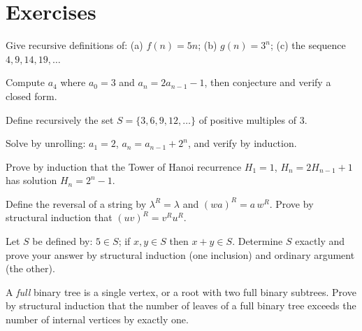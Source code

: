 \section*{Exercises}

\begin{exercise}{\easy}
Give recursive definitions of: (a) $f(n) = 5n$; (b) $g(n) = 3^{n}$;
(c) the sequence $4, 9, 14, 19, \ldots$
\end{exercise}

\begin{exercise}{\easy}
Compute $a_4$ where $a_0 = 3$ and $a_{n} = 2a_{n-1} - 1$, then conjecture
and verify a closed form.
\end{exercise}

\begin{exercise}{\easy}
Define recursively the set $S = \{3, 6, 9, 12, \ldots\}$ of positive
multiples of $3$.
\end{exercise}

\begin{exercise}{\medium}
Solve by unrolling: $a_1 = 2$, $a_n = a_{n-1} + 2^{n}$, and verify by
induction.
\end{exercise}

\begin{exercise}{\medium}
Prove by induction that the Tower of Hanoi recurrence $H_1 = 1$,
$H_n = 2H_{n-1} + 1$ has solution $H_n = 2^{n} - 1$.
\end{exercise}

\begin{exercise}{\medium}
Define the reversal of a string by $\lambda^{R} = \lambda$ and
$(wa)^{R} = a\,w^{R}$. Prove by structural induction that
$(uv)^{R} = v^{R} u^{R}$.
\end{exercise}

\begin{exercise}{\medium}
Let $S$ be defined by: $5 \in S$; if $x, y \in S$ then $x + y \in S$.
Determine $S$ exactly and prove your answer by structural induction (one
inclusion) and ordinary argument (the other).
\end{exercise}

\begin{exercise}{\medium}
A \emph{full} binary tree is a single vertex, or a root with two full
binary subtrees. Prove by structural induction that the number of leaves
of a full binary tree exceeds the number of internal vertices by exactly
one.
\end{exercise}

